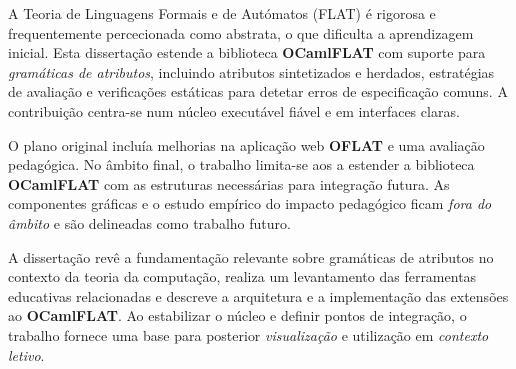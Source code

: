
%

A Teoria de Linguagens Formais e de Autómatos (FLAT) é rigorosa e frequentemente percecionada como abstrata, o que dificulta a aprendizagem inicial. 
Esta dissertação estende a biblioteca \textbf{OCamlFLAT} com suporte para \emph{gramáticas de atributos}, incluindo atributos sintetizados e herdados, 
estratégias de avaliação e verificações estáticas para detetar erros de especificação comuns. A contribuição centra-se num núcleo executável fiável e 
em interfaces claras.

O plano original incluía melhorias na aplicação web \textbf{OFLAT} e uma avaliação pedagógica. No âmbito final, o trabalho limita-se aos 
a estender a biblioteca \textbf{OCamlFLAT} com as estruturas necessárias para integração futura. As componentes gráficas e o estudo empírico do 
impacto pedagógico ficam \emph{fora do âmbito} e são delineadas como trabalho futuro.

A dissertação revê a fundamentação relevante sobre gramáticas de atributos no contexto da teoria da computação, realiza um levantamento das 
ferramentas educativas relacionadas e descreve a arquitetura e a implementação das extensões ao \textbf{OCamlFLAT}. Ao estabilizar o núcleo e 
definir pontos de integração, o trabalho fornece uma base para posterior \emph{visualização} e utilização em \emph{contexto letivo}.
